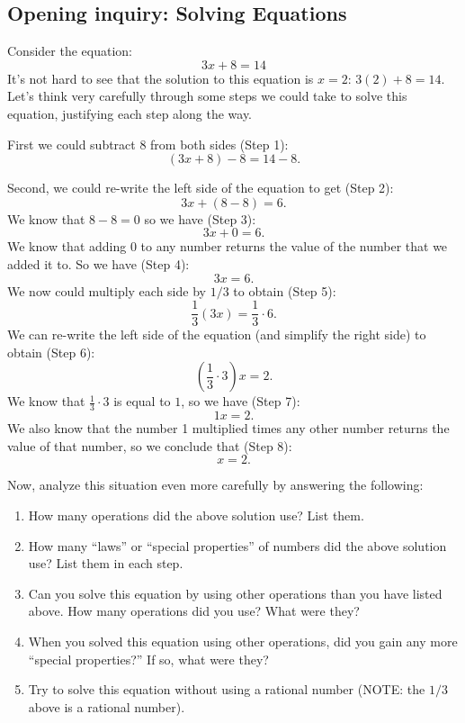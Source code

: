 \documentclass[11pt]{article}
\newenvironment{task}
	{\begin{mdframed}[linecolor=lightgray, linewidth=3pt]\raggedright}
	{\end{mdframed}}
\theoremstyle{definition}
\begin{document}
\subsection{Opening inquiry: Solving Equations}
\begin{task}
  Consider the equation:
\[ 3x + 8 = 14 \]
It's not hard to see that the solution to this equation is $x=2$: $3(2)+8 = 14$. Let's think very carefully through some steps we 
could take to solve this equation, justifying each step along the way. 

First we could subtract $8$ from both sides (Step 1):
\[ (3x+8)-8 = 14 -8.\]

Second, we could re-write the left side of the equation to get (Step 2):
\[ 3x + (8-8) = 6.\]
We know that $8-8=0$ so we have (Step 3):
\[ 3x + 0 = 6.\]
We know that adding 0 to any number returns the value of the number that we added it to. So we have (Step 4):
\[ 3x = 6.\]
We now could multiply each side by $1/3$ to obtain (Step 5):
\[ \frac{1}{3}(3x) = \frac{1}{3}\cdot 6. \]
We can re-write the left side of the equation (and simplify the right side) to obtain (Step 6):
\[ \left( \frac{1}{3}\cdot 3 \right)x = 2. \]
We know that $\frac{1}{3}\cdot 3$ is equal to $1$, so we have (Step 7):
\[ 1x = 2.\]
We also know that the number 1 multiplied times any other number returns the value of that number, so we conclude that (Step 8):
\[ x = 2.\]

Now, analyze this situation even more carefully by answering the following:
\begin{enumerate}
  \item How many operations did the above solution use? List them.
  \item How many ``laws'' or ``special properties'' of numbers did the above solution use? List them in each step. 
  
  \item Can you solve this equation by using other operations than you have listed above. How many operations did you use? What were they? 
  \item When you solved this equation using other operations, did you gain any more ``special properties?'' If so, what were they?
  \item Try to solve this equation without using a rational number (NOTE: the $1/3$ above is a rational number).
\end{enumerate}
\end{task}
\end{document}
